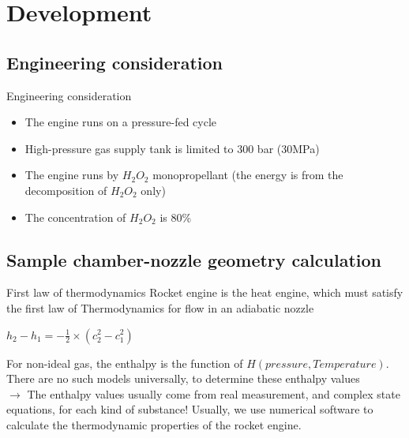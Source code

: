 \documentclass{beamer}
\begin{document}
\section{Development}

\subsection{Engineering consideration}

\begin{frame}{Engineering consideration}
    \begin{itemize}
        \item The engine runs on a pressure-fed cycle
        \item High-pressure gas supply tank is limited to 300 bar (30MPa)
        \item The engine runs by $H_2O_2$ monopropellant (the energy is from the decomposition of $H_2O_2$ only)
        \item The concentration of $H_2O_2$ is 80\%
    \end{itemize}
\end{frame}

\subsection{Sample chamber-nozzle geometry calculation}
\begin{frame}{First law of thermodynamics}
    Rocket engine is the heat engine, which must satisfy the first law of Thermodynamics for flow in an adiabatic nozzle \\
    \begin{center}
        $h_2 - h_1 = -\frac{1}{2}\times(c_2^2 - c_1^2)$
    \end{center}    
    For non-ideal gas, the enthalpy is the function of $H(pressure, Temperature)$. There are no such models universally, to determine these enthalpy values \\
    $\rightarrow$ The enthalpy values usually come from real measurement, and complex state equations, for each kind of substance! Usually, we use numerical software to calculate the thermodynamic properties of the rocket engine.
\end{frame}
\end{document}
